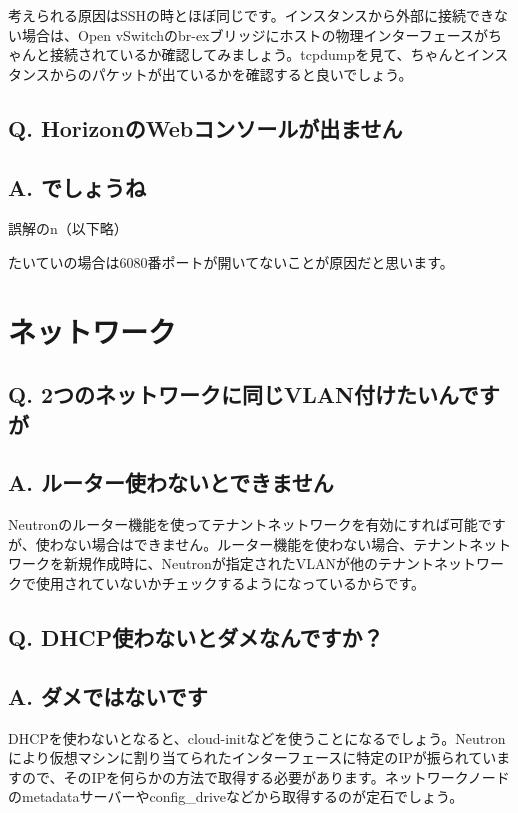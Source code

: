 \documentclass[9pt,b5paper,tombo,openany]{jsbook}
\begin{document}
考えられる原因はSSHの時とほぼ同じです。インスタンスから外部に接続できない場合は、Open vSwitchのbr-exブリッジにホストの物理インターフェースがちゃんと接続されているか確認してみましょう。tcpdumpを見て、ちゃんとインスタンスからのパケットが出ているかを確認すると良いでしょう。

\subsection*{{\LARGE\bfseries Q.} HorizonのWebコンソールが出ません}
\subsection*{{\LARGE\bfseries A.} でしょうね}
誤解のn（以下略）

たいていの場合は6080番ポートが開いてないことが原因だと思います。

\section{ネットワーク}

\subsection*{{\LARGE\bfseries Q.} 2つのネットワークに同じVLAN付けたいんですが}
\subsection*{{\LARGE\bfseries A.} ルーター使わないとできません}
Neutronのルーター機能を使ってテナントネットワークを有効にすれば可能ですが、使わない場合はできません。ルーター機能を使わない場合、テナントネットワークを新規作成時に、Neutronが指定されたVLANが他のテナントネットワークで使用されていないかチェックするようになっているからです。

\subsection*{{\LARGE\bfseries Q.} DHCP使わないとダメなんですか？}
\subsection*{{\LARGE\bfseries A.} ダメではないです}
DHCPを使わないとなると、cloud-initなどを使うことになるでしょう。Neutronにより仮想マシンに割り当てられたインターフェースに特定のIPが振られていますので、そのIPを何らかの方法で取得する必要があります。ネットワークノードのmetadataサーバーやconfig\_driveなどから取得するのが定石でしょう。
\end{document}
